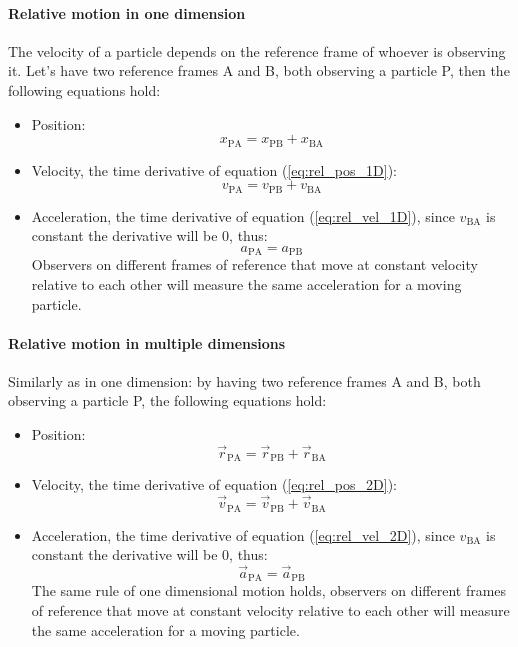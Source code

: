 \documentclass{scrartcl}
\begin{document}
    \paragraph{Relative motion in one dimension} The velocity of a particle depends on the reference frame of whoever is observing it. Let's have two reference frames A and B, both observing a particle P, then the following equations hold:
    \begin{itemize}
        \item Position:
        \begin{equation} \label{eq:rel_pos_1D}
            x_{\mathrm{PA}} = x_{\mathrm{PB}} + x_{\mathrm{BA}}
        \end{equation}
        \item Velocity, the time derivative of equation (\ref{eq:rel_pos_1D}):
        \begin{equation} \label{eq:rel_vel_1D}
            v_{\mathrm{PA}} = v_{\mathrm{PB}} + v_{\mathrm{BA}}
        \end{equation}
        \item Acceleration, the time derivative of equation (\ref{eq:rel_vel_1D}), since $v_{\mathrm{BA}}$ is constant the derivative will be $0$, thus:
        \begin{equation}
            a_{\mathrm{PA}} = a_{\mathrm{PB}}
        \end{equation}
        Observers on different frames of reference that move at constant velocity relative to each other will measure the same acceleration for a moving particle.
    \end{itemize}
    \paragraph{Relative motion in multiple dimensions} Similarly as in one dimension: by having two reference frames A and B, both observing a particle P, the following equations hold:
    \begin{itemize}
        \item Position:
        \begin{equation} \label{eq:rel_pos_2D}
            \vec{r}_{\mathrm{PA}} = \vec{r}_{\mathrm{PB}} + \vec{r}_{\mathrm{BA}}
        \end{equation}
        \item Velocity, the time derivative of equation (\ref{eq:rel_pos_2D}):
        \begin{equation} \label{eq:rel_vel_2D}
            \vec{v}_{\mathrm{PA}} = \vec{v}_{\mathrm{PB}} + \vec{v}_{\mathrm{BA}}
        \end{equation}
        \item Acceleration, the time derivative of equation (\ref{eq:rel_vel_2D}), since $v_{\mathrm{BA}}$ is constant the derivative will be $0$, thus:
        \begin{equation}
            \vec{a}_{\mathrm{PA}} = \vec{a}_{\mathrm{PB}}
        \end{equation}
        The same rule of one dimensional motion holds, observers on different frames of reference that move at constant velocity relative to each other will measure the same acceleration for a moving particle. 
    \end{itemize}
\end{document}
